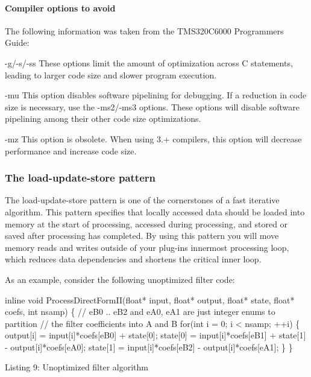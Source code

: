 \hypertarget{a00362_subsubsection__compiler_options_to_avoid_}{}\paragraph{Compiler options to avoid}\label{a00362_subsubsection__compiler_options_to_avoid_}
 The following information was taken from the T\+M\+S320\+C6000 Programmer\textquotesingle{}s Guide\+:


\begin{DoxyItemize}
\item {\ttfamily -\/g/-\/s/-\/ss}  These options limit the amount of optimization across C statements, leading to larger code size and slower program execution.  


\item {\ttfamily -\/mu}  This option disables software pipelining for debugging. If a reduction in code size is necessary, use the {\ttfamily -\/ms2}/{\ttfamily -\/ms3} options. These options will disable software pipelining among their other code size optimizations.  


\item {\ttfamily -\/mz}  This option is obsolete. When using 3.+ compilers, this option will decrease performance and increase code size.  


\end{DoxyItemize}

\hypertarget{a00362_subsection__the_loadupdatestore_pattern}{}\subsubsection{The load-\/update-\/store pattern}\label{a00362_subsection__the_loadupdatestore_pattern}
 The load-\/update-\/store pattern is one of the cornerstones of a fast iterative algorithm. This pattern specifies that locally accessed data should be loaded into memory at the start of processing, accessed during processing, and stored or saved after processing has completed. By using this pattern you will move memory reads and writes outside of your plug-\/in\textquotesingle{}s innermost processing loop, which reduces data dependencies and shortens the critical inner loop.

As an example, consider the following unoptimized filter code\+:


\begin{DoxyCode}
\textcolor{keyword}{inline} \textcolor{keywordtype}{void}
ProcessDirectFormII(\textcolor{keywordtype}{float}* input, \textcolor{keywordtype}{float}* output, \textcolor{keywordtype}{float}* state, \textcolor{keywordtype}{float}*
    coefs, \textcolor{keywordtype}{int} nsamp)
\{
    \textcolor{comment}{// eB0 .. eB2 and eA0, eA1 are just integer enums to partition}
    \textcolor{comment}{// the filter coefficients into A and B}
    \textcolor{keywordflow}{for}(\textcolor{keywordtype}{int} i = 0; i < nsamp; ++i)
    \{
        output[i] = input[i]*coefs[eB0] + state[0];
        state[0] = input[i]*coefs[eB1] + state[1] - output[i]*coefs[eA0];
        state[1] = input[i]*coefs[eB2] - output[i]*coefs[eA1];
    \}
\} 
\end{DoxyCode}
  Listing 9\+: Unoptimized filter algorithm

